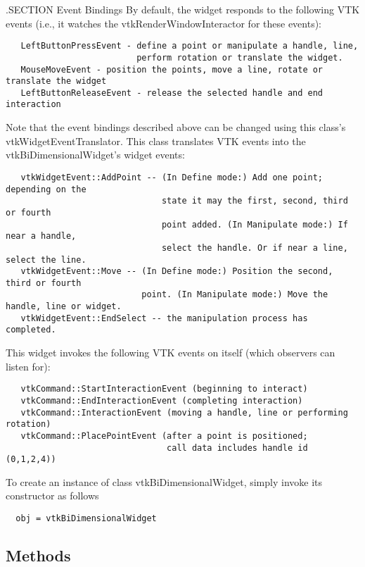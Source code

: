  .SECTION Event Bindings
 By default, the widget responds to the following VTK events (i.e., it
 watches the vtkRenderWindowInteractor for these events):
 \begin{verbatim}
   LeftButtonPressEvent - define a point or manipulate a handle, line,
                          perform rotation or translate the widget.
   MouseMoveEvent - position the points, move a line, rotate or translate the widget
   LeftButtonReleaseEvent - release the selected handle and end interaction
 \end{verbatim}

 Note that the event bindings described above can be changed using this
 class's vtkWidgetEventTranslator. This class translates VTK events 
 into the vtkBiDimensionalWidget's widget events:
 \begin{verbatim}
   vtkWidgetEvent::AddPoint -- (In Define mode:) Add one point; depending on the 
                               state it may the first, second, third or fourth 
                               point added. (In Manipulate mode:) If near a handle, 
                               select the handle. Or if near a line, select the line.
   vtkWidgetEvent::Move -- (In Define mode:) Position the second, third or fourth 
                           point. (In Manipulate mode:) Move the handle, line or widget.
   vtkWidgetEvent::EndSelect -- the manipulation process has completed.
 \end{verbatim}

 This widget invokes the following VTK events on itself (which observers
 can listen for):
 \begin{verbatim}
   vtkCommand::StartInteractionEvent (beginning to interact)
   vtkCommand::EndInteractionEvent (completing interaction)
   vtkCommand::InteractionEvent (moving a handle, line or performing rotation)
   vtkCommand::PlacePointEvent (after a point is positioned; 
                                call data includes handle id (0,1,2,4))
 \end{verbatim}

To create an instance of class vtkBiDimensionalWidget, simply
invoke its constructor as follows
\begin{verbatim}
  obj = vtkBiDimensionalWidget
\end{verbatim}
\subsection{Methods}

